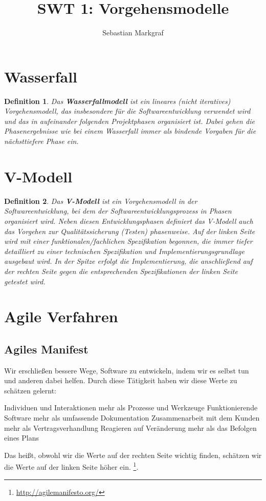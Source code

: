 \documentclass[a4paper]{article}
\title{SWT 1: Vorgehensmodelle}
\author{Sebastian Markgraf}
\theoremstyle{break}
\newtheorem{defi}{Definition}[section]
\begin{document}
    \maketitle
    \tableofcontents
    \newpage

    \section{Wasserfall}
    \begin{defi}
      Das \textbf{Wasserfallmodell} ist ein lineares (nicht iteratives) Vorgehensmodell, das insbesondere für die Softwareentwicklung verwendet wird und das in aufeinander folgenden Projektphasen organisiert ist. Dabei gehen die Phasenergebnisse wie bei einem Wasserfall immer als bindende Vorgaben für die nächsttiefere Phase ein.
    \end{defi}
    
    
    \section{V-Modell}
      \begin{defi}
        Das \textbf{V-Modell} ist ein Vorgehensmodell in der Softwareentwicklung, bei dem der Softwareentwicklungsprozess in Phasen organisiert wird. Neben diesen Entwicklungsphasen definiert das V-Modell auch das Vorgehen zur Qualitätssicherung (Testen) phasenweise. Auf der linken Seite wird mit einer funktionalen/fachlichen Spezifikation begonnen, die immer tiefer detailliert zu einer technischen Spezifikation und Implementierungsgrundlage ausgebaut wird. In der Spitze erfolgt die Implementierung, die anschließend auf der rechten Seite gegen die entsprechenden Spezifikationen der linken Seite getestet wird.
      \end{defi}
    
    \section{Agile Verfahren}
        \subsection{Agiles Manifest}
        \begin{flushleft}
          Wir erschließen bessere Wege, Software zu entwickeln,
          indem wir es selbst tun und anderen dabei helfen.
          Durch diese Tätigkeit haben wir diese Werte zu schätzen gelernt:
          
          Individuen und Interaktionen mehr als Prozesse und Werkzeuge
          Funktionierende Software mehr als umfassende Dokumentation
          Zusammenarbeit mit dem Kunden mehr als Vertragsverhandlung
          Reagieren auf Veränderung mehr als das Befolgen eines Plans

          Das heißt, obwohl wir die Werte auf der rechten Seite wichtig finden,
          schätzen wir die Werte auf der linken Seite höher ein. \footnote{\url{http://agilemanifesto.org/}}.
        \end{flushleft}
\end{document}
